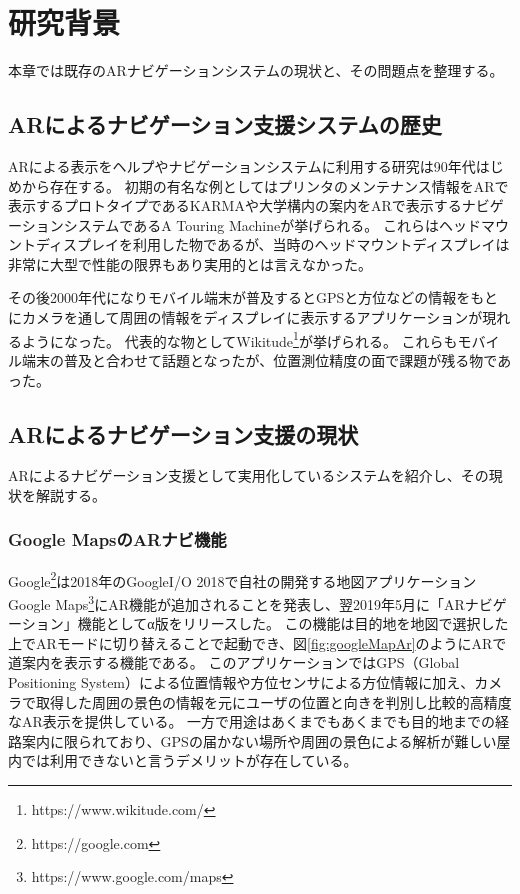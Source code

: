 \chapter{研究背景}
\label{chap:background}

本章では既存のARナビゲーションシステムの現状と、その問題点を整理する。

\newpage



\section{ARによるナビゲーション支援システムの歴史}
ARによる表示をヘルプやナビゲーションシステムに利用する研究は90年代はじめから存在する。
初期の有名な例としてはプリンタのメンテナンス情報をARで表示するプロトタイプであるKARMA\cite{10.1145/159544.159587}や大学構内の案内をARで表示するナビゲーションシステムであるA Touring Machine\cite{629922}が挙げられる。
これらはヘッドマウントディスプレイを利用した物であるが、当時のヘッドマウントディスプレイは非常に大型で性能の限界もあり実用的とは言えなかった。

その後2000年代になりモバイル端末が普及するとGPSと方位などの情報をもとにカメラを通して周囲の情報をディスプレイに表示するアプリケーションが現れるようになった。
代表的な物としてWikitude\footnote{\textsf{https://www.wikitude.com/}}が挙げられる。
これらもモバイル端末の普及と合わせて話題となったが、位置測位精度の面で課題が残る物であった。



\section{ARによるナビゲーション支援の現状}
\label{current}
ARによるナビゲーション支援として実用化しているシステムを紹介し、その現状を解説する。



\subsection{Google MapsのARナビ機能}
Google\footnote{\textsf{https://google.com}}は2018年のGoogleI/O 2018で自社の開発する地図アプリケーションGoogle Maps\footnote{\textsf{https://www.google.com/maps}}にAR機能が追加されることを発表し、翌2019年5月に「ARナビゲーション」機能としてα版をリリースした。
この機能は目的地を地図で選択した上でARモードに切り替えることで起動でき、図\ref{fig:googleMapAr}のようにARで道案内を表示する機能である。
このアプリケーションではGPS（Global Positioning System）による位置情報や方位センサによる方位情報に加え、カメラで取得した周囲の景色の情報を元にユーザの位置と向きを判別し比較的高精度なAR表示を提供している。
一方で用途はあくまでもあくまでも目的地までの経路案内に限られており、GPSの届かない場所や周囲の景色による解析が難しい屋内では利用できないと言うデメリットが存在している。

